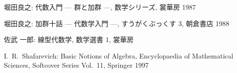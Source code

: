 \documentclass[12pt,twoside]{jarticle}
\begin{document}
\begin{thebibliography}{ABC}

堀田良之: 代数入門 --- 群と加群 ---, 数学シリーズ,
裳華房 1987

堀田良之: 加群十話 --- 代数学入門 ---, すうがくぶっくす 3, 
朝倉書店 1988 





佐武 一郎: 線型代数学, 数学選書 1, 裳華房

I.\ R.\ Shafarevich: Basic Notions of Algebra,
Encyclopaedia of Mathematical Sciences, Softcover Series Vol.~11,
Springer 1997






\end{thebibliography}

\end{document}
